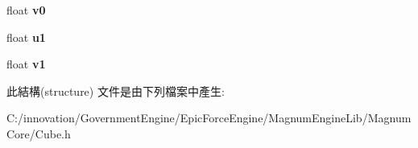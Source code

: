 \begin{DoxyCompactItemize}
\item 
float {\bfseries v0}\hypertarget{struct_i_dream_sky_1_1_cube_1_1_vertex_ad1e7ef855bf5e6954c2b4aa1d48f6c5b}{}\label{struct_i_dream_sky_1_1_cube_1_1_vertex_ad1e7ef855bf5e6954c2b4aa1d48f6c5b}

\item 
float {\bfseries u1}\hypertarget{struct_i_dream_sky_1_1_cube_1_1_vertex_a7f811698ded3c95c9bc7ed7e8beba9f4}{}\label{struct_i_dream_sky_1_1_cube_1_1_vertex_a7f811698ded3c95c9bc7ed7e8beba9f4}

\item 
float {\bfseries v1}\hypertarget{struct_i_dream_sky_1_1_cube_1_1_vertex_a8b0e6ac14d6419befb5b709ebeabea2f}{}\label{struct_i_dream_sky_1_1_cube_1_1_vertex_a8b0e6ac14d6419befb5b709ebeabea2f}

\end{DoxyCompactItemize}


此結構(structure) 文件是由下列檔案中產生\+:\begin{DoxyCompactItemize}
\item 
C\+:/innovation/\+Government\+Engine/\+Epic\+Force\+Engine/\+Magnum\+Engine\+Lib/\+Magnum\+Core/Cube.\+h\end{DoxyCompactItemize}
